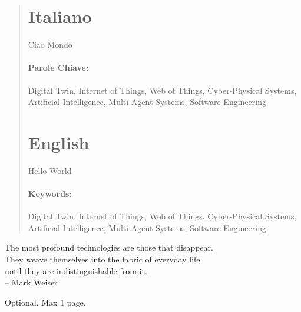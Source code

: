 \documentclass[12pt,a4paper,openright,twoside]{book}
\begin{document}
	
\frontmatter


\begin{abstract}	

\section*{Italiano}

Ciao Mondo


\paragraph{Parole Chiave:} 
Digital Twin, Internet of Things, Web of Things, Cyber-Physical Systems, Artificial Intelligence, Multi-Agent Systems, Software Engineering


\newpage

\section*{English}
Hello World
\paragraph{Keywords:} Digital Twin, Internet of Things, Web of Things, Cyber-Physical Systems, Artificial Intelligence, Multi-Agent Systems, Software Engineering

\end{abstract}



\begin{dedication} %
The most profound technologies are those that disappear.
\\
They weave themselves into the fabric of everyday life
\\
until they are indistinguishable from it.
\\
\vspace{1em}
-- Mark Weiser
\end{dedication}


\begin{acknowledgements} %
Optional. Max 1 page.
\end{acknowledgements}
\end{document}
